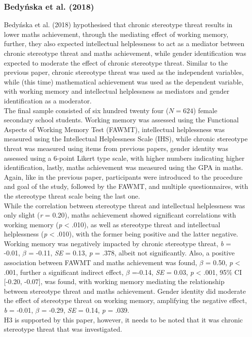 \documentclass[
  stu,floatsintext]{apa7}
\begin{document}
\subsubsection{Bedyńska et al. (2018)}\label{bedynskachronicstereotypethreat2018}

Bedyńska et al. (2018) hypothesised that chronic stereotype threat results in lower maths achievement, through the mediating effect of working memory, further, they also expected intellectual helplessness to act as a mediator between chronic stereotype threat and maths achievement, while gender identification was expected to moderate the effect of chronic stereotype threat.
Similar to the previous paper, chronic stereotype threat was used as the independent variables, while (this time) mathematical achievement was used as the dependent variable, with working memory and intellectual helplessness as mediators and gender identification as a moderator.\\
The final sample consisted of six hundred twenty four (\(N=624\)) female secondary school students.
Working memory was assessed using the Functional Aspects of Working Memory Test (FAWMT), intellectual helplessness was measured using the Intellectual Helplessness Scale (IHS), while chronic stereotype threat was measured using items from previous papers, gender identity was assessed using a 6-point Likert type scale, with higher numbers indicating higher identification, lastly, maths achievement was measured using the GPA in maths.\\
Again, like in the previous paper, participants were introduced to the procedure and goal of the study, followed by the FAWMT, and multiple questionnaires, with the stereotype threat scale being the last one.\\
While the correlation between stereotype threat and intellectual helplessness was only slight (\emph{r} = 0.20), maths achievement showed significant correlations with working memory (\emph{p} \textless{} .010), as well as stereotype threat and intellectual helplessness (\emph{p} \textless{} .010), with the former being positive and the latter negative.
Working memory was negatively impacted by chronic stereotype threat, \emph{b} = -0.01, \(\beta\) = -0.11, \emph{SE} = 0.13, \emph{p} = .378, albeit not significantly.
Also, a positive association between FAWMT and maths achievement was found, \(\beta\) = 0.50, \emph{p} \textless{} .001, further a significant indirect effect, \(\beta\) =-0.14, \emph{SE} = 0.03, \emph{p} \textless{} .001, 95\% CI {[}-0.20, -0.07{]}, was found, with working memory mediating the relationship between stereotype threat and maths achievement.
Gender identity did moderate the effect of stereotype threat on working memory, amplifying the negative effect, \emph{b} = -0.01, \(\beta\) = -0.29, \emph{SE} = 0.14, \emph{p} = .039.\\
H3 is supported by this paper, however, it needs to be noted that it was chronic stereotype threat that was investigated.
\end{document}
